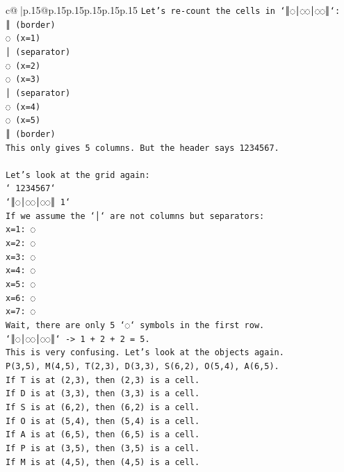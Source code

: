 \documentclass{article}
\begin{document}
{\begin{supertabular}{c@{$\;$}|p{.15\linewidth}@{}p{.15\linewidth}p{.15\linewidth}p{.15\linewidth}p{.15\linewidth}p{.15\linewidth}}
{{{\texttt{Let's re{-}count the cells in `║◌│◌◌│◌◌║`:} \\
\texttt{║ (border)} \\
\texttt{◌ (x=1)} \\
\texttt{│ (separator)} \\
\texttt{◌ (x=2)} \\
\texttt{◌ (x=3)} \\
\texttt{│ (separator)} \\
\texttt{◌ (x=4)} \\
\texttt{◌ (x=5)} \\
\texttt{║ (border)} \\
\texttt{This only gives 5 columns. But the header says 1234567.} \\
\\ 
\texttt{Let's look at the grid again:} \\
\texttt{` 1234567`} \\
\texttt{`║◌│◌◌│◌◌║ 1`} \\
\texttt{If we assume the `│` are not columns but separators:} \\
\texttt{x=1: ◌} \\
\texttt{x=2: ◌} \\
\texttt{x=3: ◌} \\
\texttt{x=4: ◌} \\
\texttt{x=5: ◌} \\
\texttt{x=6: ◌} \\
\texttt{x=7: ◌} \\
\texttt{Wait, there are only 5 `◌` symbols in the first row.} \\
\texttt{`║◌│◌◌│◌◌║` {-}> 1 + 2 + 2 = 5.} \\
\texttt{This is very confusing. Let's look at the objects again.} \\
\texttt{P(3,5), M(4,5), T(2,3), D(3,3), S(6,2), O(5,4), A(6,5).} \\
\texttt{If T is at (2,3), then (2,3) is a cell.} \\
\texttt{If D is at (3,3), then (3,3) is a cell.} \\
\texttt{If S is at (6,2), then (6,2) is a cell.} \\
\texttt{If O is at (5,4), then (5,4) is a cell.} \\
\texttt{If A is at (6,5), then (6,5) is a cell.} \\
\texttt{If P is at (3,5), then (3,5) is a cell.} \\
\texttt{If M is at (4,5), then (4,5) is a cell.} \\
\\ 
}}}
\end{supertabular}}
\end{document}
